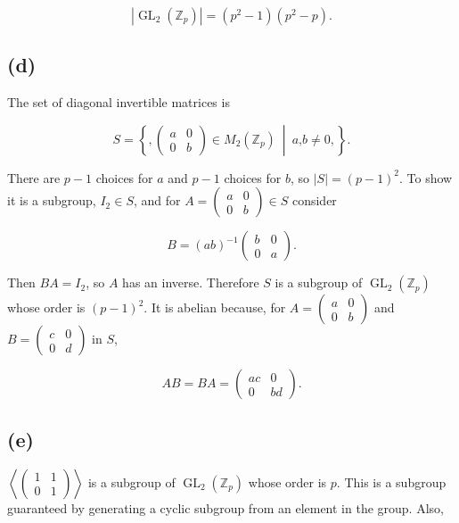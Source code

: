 \[\left| {\operatorname{GL}_{2}\left( \mathbb{Z}_{p} \right)} \right| = \left( {p^{2} - 1} \right)\left( {p^{2} - p} \right).\]

\subsection{(d)}

The set of diagonal invertible matrices is

\[S = \left\{ ,\begin{pmatrix}
a & 0 \\
0 & b
\end{pmatrix} \in M_{2}\left( \mathbb{Z}_{p} \right)\  \middle| \ a\text{,}b \neq 0, \right\}.\]

There are \(p - 1\) choices for \(a\) and \(p - 1\) choices for \(b\), so \(|S| = \left( {p - 1} \right)^{2}\). To show it is a subgroup, \(I_{2} \in S\), and for \(A = \begin{pmatrix}
a & 0 \\
0 & b
\end{pmatrix} \in S\) consider

\[B = \left( {ab} \right)^{- 1}\begin{pmatrix}
b & 0 \\
0 & a
\end{pmatrix}.\]

Then \(BA = I_{2}\), so \(A\) has an inverse. Therefore \(S\) is a subgroup of \(\operatorname{GL}_{2}\left( \mathbb{Z}_{p} \right)\) whose order is \(\left( {p - 1} \right)^{2}\). It is abelian because, for \(A = \begin{pmatrix}
a & 0 \\
0 & b
\end{pmatrix}\) and \(B = \begin{pmatrix}
c & 0 \\
0 & d
\end{pmatrix}\) in \(S\),

\[AB = BA = \begin{pmatrix}
{ac} & 0 \\
0 & {bd}
\end{pmatrix}.\]

\subsection{(e)}

\(\left\langle \begin{pmatrix}
1 & 1 \\
0 & 1
\end{pmatrix} \right\rangle\) is a subgroup of \(\operatorname{GL}_{2}\left( \mathbb{Z}_{p} \right)\) whose order is \(p\). This is a subgroup guaranteed by generating a cyclic subgroup from an element in the group. Also,

